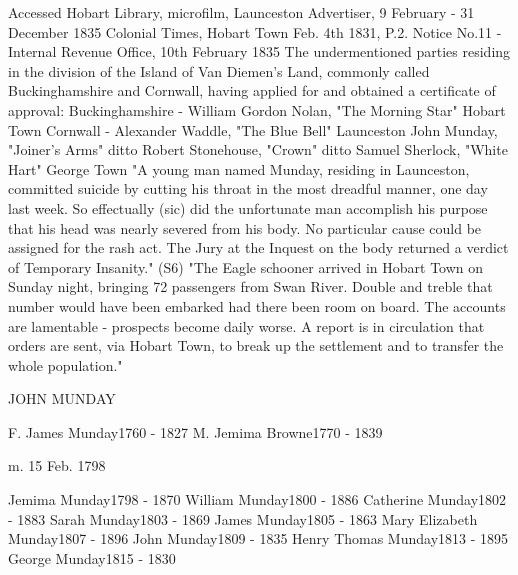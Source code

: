     Accessed Hobart Library, microfilm, Launceston Advertiser, 9 February - 31 December 1835
      Colonial Times, Hobart Town Feb. 4th 1831, P.2.
      Notice No.11 -
    Internal Revenue Office, 10th February 1835
    The undermentioned parties residing in the division of the Island of Van Diemen's Land, commonly called Buckinghamshire and Cornwall, having applied for and obtained a certificate of approval:
    Buckinghamshire -
    William Gordon Nolan, "The Morning Star" Hobart Town
    Cornwall -
    Alexander Waddle, "The Blue Bell" Launceston
    John Munday, "Joiner's Arms" ditto
    Robert Stonehouse, "Crown" ditto
    Samuel Sherlock, "White Hart" George Town
      "A young man named Munday, residing in Launceston, committed suicide by cutting his throat in the most dreadful manner, one day last week. So effectually (sic) did the unfortunate man accomplish his purpose that his head was nearly severed from his body. No particular cause could be assigned for the rash act. The Jury at the Inquest on the body returned a verdict of Temporary Insanity." (S6)
      "The Eagle schooner arrived in Hobart Town on Sunday night, bringing 72 passengers from Swan River. Double and treble that number would have been embarked had there been room on board. The accounts are lamentable - prospects become daily worse. A report is in circulation that orders are sent, via Hobart Town, to break up the settlement and to transfer the whole population."


JOHN MUNDAY

    F.  James Munday1760 - 1827
    M.  Jemima Browne1770 - 1839

m. 15 Feb. 1798

    Jemima Munday1798 - 1870
    William Munday1800 - 1886
    Catherine Munday1802 - 1883
    Sarah Munday1803 - 1869
    James Munday1805 - 1863
    Mary Elizabeth Munday1807 - 1896
    John Munday1809 - 1835
    Henry Thomas Munday1813 - 1895
    George Munday1815 - 1830
